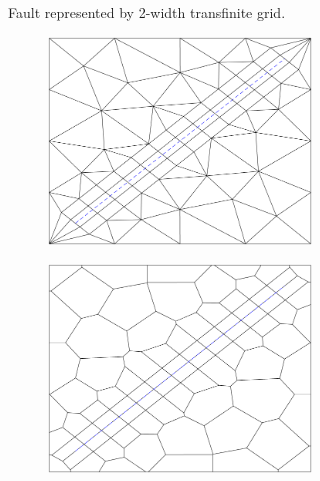 \begin{figure}[htp]
\begin{subfigure}[b]{\textwidth}
\begin{subfigure}[b]{0.35\textwidth}
        \end{subfigure}
        \caption{Fault represented by 2-width transfinite grid.}
        \label{fig:trans-fault-1}
    \end{subfigure}
    \begin{subfigure}[b]{\textwidth}
        \centering
        \begin{subfigure}[b]{0.35\textwidth}
            \centering
            \includegraphics[width=\textwidth]{report/Images/Combining software/Faults as transfinite grids/face_constraint_as_transfinite_delaunay_2.png}
        \end{subfigure}
        \begin{subfigure}[b]{0.35\textwidth}
            \centering
            \includegraphics[width=\textwidth]{report/Images/Combining software/Faults as transfinite grids/face_constraint_as_transfinite_pebi_2.png}

\end{subfigure}
\end{subfigure}
\end{figure}
